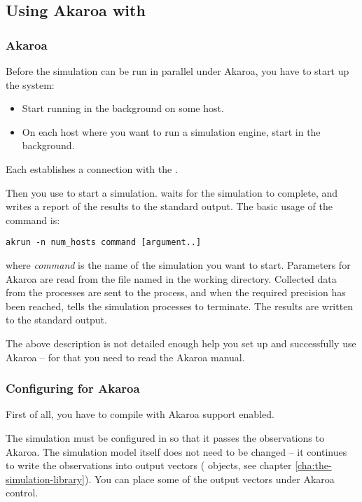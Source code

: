 \subsection{Using Akaroa with {\opp}}

\subsubsection{Akaroa}

Before the simulation can be run in parallel under Akaroa, you have to
start up the system:

\begin{itemize}
  \item{Start  running in the background on some host.}
  \item{On each host where you want to run a simulation engine,
     start  in the background.}
\end{itemize}

Each  establishes a connection with the .

Then you use  to start a simulation.  waits
for the simulation to complete, and writes a report of the results
to the standard output. The basic usage of the  command is:

\begin{verbatim}
akrun -n num_hosts command [argument..]
\end{verbatim}

where \textit{command} is the name of the simulation you want to start.
Parameters for Akaroa are read from the file named  in
the working directory. Collected data from the processes are
sent to the  process, and when the required precision
has been reached,  tells the simulation processes to
terminate. The results are written to the standard output.

The above description is not detailed enough help you
set up and successfully use Akaroa -- for that you need to read the
Akaroa manual.

\subsubsection{Configuring {\opp} for Akaroa}

First of all, you have to compile {\opp} with Akaroa support enabled.

The {\opp} simulation must be configured in 
so that it passes the observations to Akaroa. The simulation model itself does
not need to be changed -- it continues to write
the observations into output vectors ( objects,
see chapter \ref{cha:the-simulation-library}). You can place some of
the output vectors under Akaroa control.

